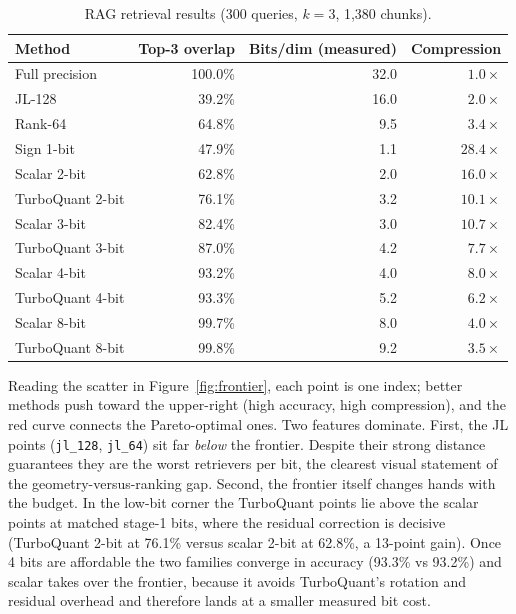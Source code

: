 \documentclass[11pt]{article}
\begin{document}
\begin{table}[H]
  \centering
  \caption{RAG retrieval results (300 queries, $k = 3$, 1{,}380 chunks).}
  \label{tab:rag}
  \begin{tabular}{lrrr}
    \toprule
    Method & Top-3 overlap & Bits/dim (measured) & Compression \\
    \midrule
    Full precision    & 100.0\% & 32.0 & $1.0\times$ \\
    JL-128            & 39.2\%  & 16.0 & $2.0\times$ \\
    Rank-64           & 64.8\%  & 9.5  & $3.4\times$ \\
    Sign 1-bit        & 47.9\%  & 1.1  & $28.4\times$ \\
    Scalar 2-bit      & 62.8\%  & 2.0  & $16.0\times$ \\
    TurboQuant 2-bit  & 76.1\%  & 3.2  & $10.1\times$ \\
    Scalar 3-bit      & 82.4\%  & 3.0  & $10.7\times$ \\
    TurboQuant 3-bit  & 87.0\%  & 4.2  & $7.7\times$ \\
    Scalar 4-bit      & 93.2\%  & 4.0  & $8.0\times$ \\
    TurboQuant 4-bit  & 93.3\%  & 5.2  & $6.2\times$ \\
    Scalar 8-bit      & 99.7\%  & 8.0  & $4.0\times$ \\
    TurboQuant 8-bit  & 99.8\%  & 9.2  & $3.5\times$ \\
    \bottomrule
  \end{tabular}
\end{table}

Reading the scatter in Figure~\ref{fig:frontier}, each point is one index; better methods push toward the upper-right (high accuracy, high compression), and the red curve connects the Pareto-optimal ones. Two features dominate. First, the JL points (\texttt{jl\_128}, \texttt{jl\_64}) sit far \emph{below} the frontier. Despite their strong distance guarantees they are the worst retrievers per bit, the clearest visual statement of the geometry-versus-ranking gap. Second, the frontier itself changes hands with the budget. In the low-bit corner the TurboQuant points lie above the scalar points at matched stage-1 bits, where the residual correction is decisive (TurboQuant 2-bit at 76.1\% versus scalar 2-bit at 62.8\%, a 13-point gain). Once 4 bits are affordable the two families converge in accuracy (93.3\% vs 93.2\%) and scalar takes over the frontier, because it avoids TurboQuant's rotation and residual overhead and therefore lands at a smaller measured bit cost.
\end{document}
